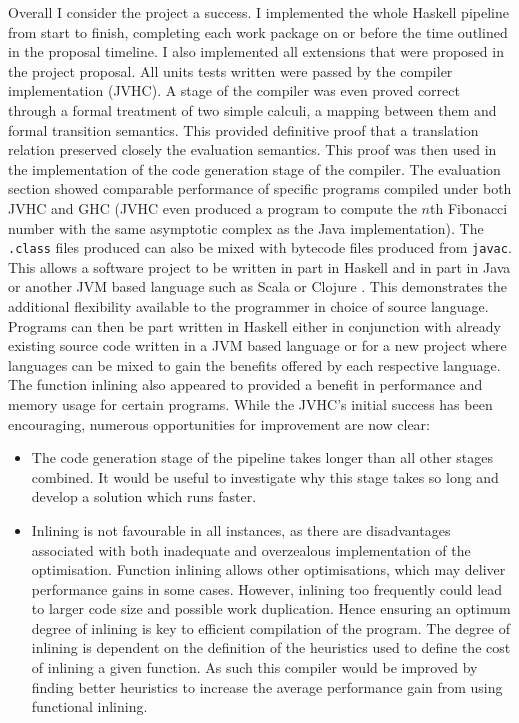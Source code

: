 \documentclass[float=false, crop=false]{standalone}
\begin{document}
Overall I consider the project a success. I implemented the whole Haskell
pipeline from start to finish, completing each work package on or
before the time outlined in the proposal timeline. I also implemented
all extensions that were proposed in the project proposal. 
All units tests written were passed by the compiler implementation (JVHC). 
A stage of the compiler was even proved correct through
a formal treatment of two simple calculi, a mapping between them
and formal transition semantics. This provided definitive proof that a translation
relation preserved closely the evaluation semantics. This proof was then 
used in the implementation of the code generation stage of the compiler.
The evaluation section showed comparable performance of specific programs
compiled under both JVHC and GHC (JVHC even produced a program to compute
the $n$th Fibonacci number with the same asymptotic complex as the Java
implementation). The \verb|.class| files produced can also be mixed with 
bytecode files produced from \verb|javac|. This allows a software project to
be written in part in Haskell and in part in Java or another JVM based language
such as Scala \cite{scala} or Clojure \cite{clojure}. This demonstrates the 
additional flexibility available to the programmer in choice of source language.
Programs can then be part written in Haskell either in conjunction with already 
existing source code written in a JVM based language or for a new project
where languages can be mixed to gain the benefits offered by each respective language.
The function inlining also
appeared to provided a benefit in performance and memory usage for certain
programs. 
While the JVHC’s initial success has been encouraging, numerous opportunities for improvement are now clear:
\begin{itemize}

\item The code generation stage of the pipeline takes longer than all other stages 
combined. It would be useful to investigate why this stage takes so long 
and develop a solution which runs faster.

\item Inlining is not favourable in all instances, as there are disadvantages associated with both inadequate and overzealous implementation of the optimisation.  Function inlining allows other optimisations, which may deliver performance gains in some cases. However, inlining too frequently could lead to larger code size and possible work duplication. Hence ensuring an optimum degree of inlining is key to efficient compilation of the program. The degree of inlining is dependent on the definition of the heuristics used to define the cost of inlining a given function. As such this compiler would be improved by finding better heuristics to increase the average performance gain from using functional inlining.
\end{itemize}
\end{document}
